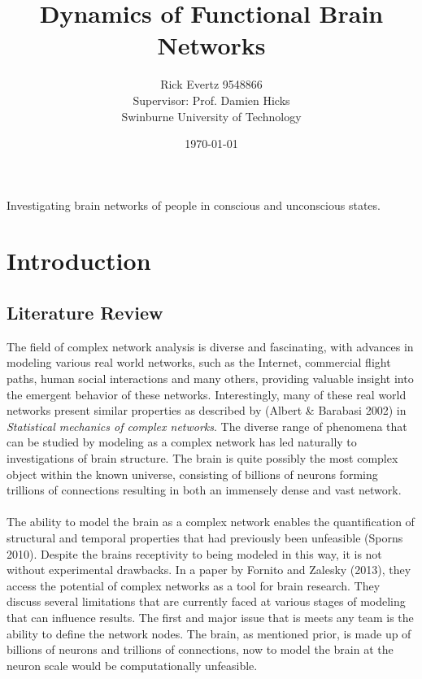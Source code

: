 \documentclass{article}
\def\ni{\noindent}
\begin{document}
\title{\bf{Dynamics of Functional Brain Networks}}
\author{Rick Evertz 9548866\\
Supervisor: Prof. Damien Hicks\\
Swinburne University of Technology}
\date{\today}
\maketitle
\abstract 
\ni Investigating brain networks of people in conscious and unconscious states.
\pagebreak

\tableofcontents
\pagebreak
\section{Introduction}
\subsection{Literature Review}
The field of complex network analysis is diverse and fascinating, with advances in modeling various real world networks, such as the Internet, commercial flight paths, human social interactions and many others, providing valuable insight into the emergent behavior of these networks. Interestingly, many of these real world networks present similar properties as described by (Albert \& Barabasi 2002) in \emph{Statistical mechanics of complex networks}. The diverse range of phenomena that can be studied by modeling as a complex network has led naturally to investigations of brain structure. The brain is quite possibly the most complex object within the known universe, consisting of billions of neurons forming trillions of connections resulting in both an immensely dense and vast network.
\\
\\
The ability to model the brain as a complex network enables the quantification of structural and temporal properties that had previously been unfeasible (Sporns 2010). Despite the brains receptivity to being modeled in this way, it is not without experimental drawbacks. In a paper by Fornito and Zalesky (2013), they access the potential of complex networks as a tool for brain research. They discuss several limitations that are currently faced at various stages of modeling that can influence results. The first and major issue that is meets any team is the ability to define the network nodes. The brain, as mentioned prior, is made up of billions of neurons and trillions of connections, now to model the brain at the neuron scale would be computationally unfeasible.\\
\\ 
\end{document}
